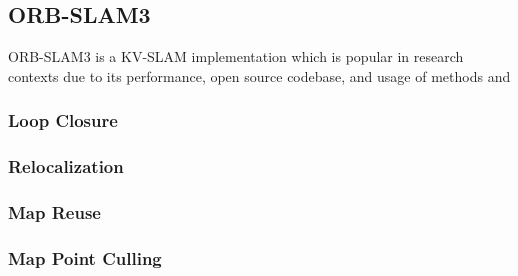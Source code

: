 \subsection{ORB-SLAM3}

ORB-SLAM3 is a KV-SLAM implementation which is popular in research contexts due to its performance, open source codebase, and usage of methods and 

\subsubsection{Loop Closure}
\subsubsection{Relocalization}
\subsubsection{Map Reuse}
\subsubsection{Map Point Culling}